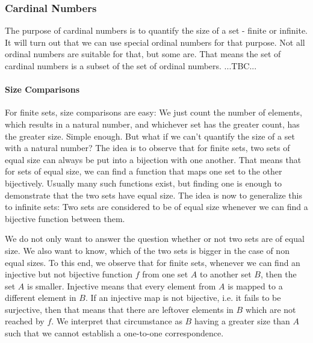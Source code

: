 



\subsubsection{Cardinal Numbers}
The purpose of cardinal numbers is to quantify the size of a set - finite or infinite. It will turn out that we can use special ordinal numbers for that purpose. Not all ordinal numbers are suitable for that, but some are. That means the set of cardinal numbers is a subset of the set of ordinal numbers. 
...TBC...

\paragraph{Size Comparisons}
For finite sets, size comparisons are easy: We just count the number of elements, which results in a natural number, and whichever set has the greater count, has the greater size. Simple enough. But what if we can't quantify the size of a set with a natural number? The idea is to observe that for finite sets, two sets of equal size can always be put into a bijection with one another. That means that for sets of equal size, we can find a function that maps one set to the other bijectively. Usually many such functions exist, but finding one is enough to demonstrate that the two sets have equal size. The idea is now to generalize this to infinite sets: Two sets are considered to be of equal size whenever we can find a bijective function between them.

\medskip
We do not only want to answer the question whether or not two sets are of equal size. We also want to know, which of the two sets is bigger in the case of non equal sizes. To this end, we observe that for finite sets, whenever we can find an injective but not bijective function $f$ from one set $A$ to another set $B$, then the set $A$ is smaller. Injective means that every element from $A$ is mapped to a different element in $B$. If an injective map is not bijective, i.e. it fails to be surjective, then that means that there are leftover elements in $B$ which are not reached by $f$. We interpret that circumstance as $B$ having a greater size than $A$ such that we cannot establish a one-to-one correspondence. 

